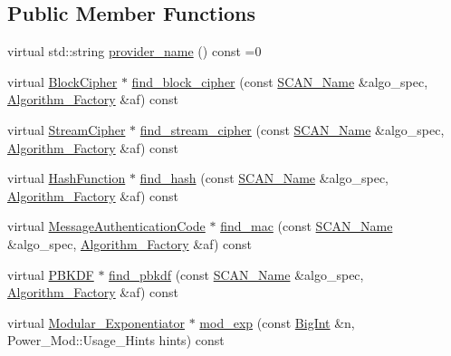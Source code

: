 \subsection*{Public Member Functions}
\begin{DoxyCompactItemize}
\item 
virtual std\-::string \hyperlink{classBotan_1_1Engine_a4c2c3ed7b3a2995e6cb8c238346b3a50}{provider\-\_\-name} () const =0
\item 
virtual \hyperlink{classBotan_1_1BlockCipher}{Block\-Cipher} $\ast$ \hyperlink{classBotan_1_1Engine_a47fd58835788badafd375554062652a2}{find\-\_\-block\-\_\-cipher} (const \hyperlink{classBotan_1_1SCAN__Name}{S\-C\-A\-N\-\_\-\-Name} \&algo\-\_\-spec, \hyperlink{classBotan_1_1Algorithm__Factory}{Algorithm\-\_\-\-Factory} \&af) const 
\item 
virtual \hyperlink{classBotan_1_1StreamCipher}{Stream\-Cipher} $\ast$ \hyperlink{classBotan_1_1Engine_a9643f23265e9505877e13487bd2e2b90}{find\-\_\-stream\-\_\-cipher} (const \hyperlink{classBotan_1_1SCAN__Name}{S\-C\-A\-N\-\_\-\-Name} \&algo\-\_\-spec, \hyperlink{classBotan_1_1Algorithm__Factory}{Algorithm\-\_\-\-Factory} \&af) const 
\item 
virtual \hyperlink{classBotan_1_1HashFunction}{Hash\-Function} $\ast$ \hyperlink{classBotan_1_1Engine_a68bc4f2f1f27610f2fec199914a2bd93}{find\-\_\-hash} (const \hyperlink{classBotan_1_1SCAN__Name}{S\-C\-A\-N\-\_\-\-Name} \&algo\-\_\-spec, \hyperlink{classBotan_1_1Algorithm__Factory}{Algorithm\-\_\-\-Factory} \&af) const 
\item 
virtual \hyperlink{classBotan_1_1MessageAuthenticationCode}{Message\-Authentication\-Code} $\ast$ \hyperlink{classBotan_1_1Engine_aa9eee4d6734e13fcb974772d9a6cddcf}{find\-\_\-mac} (const \hyperlink{classBotan_1_1SCAN__Name}{S\-C\-A\-N\-\_\-\-Name} \&algo\-\_\-spec, \hyperlink{classBotan_1_1Algorithm__Factory}{Algorithm\-\_\-\-Factory} \&af) const 
\item 
virtual \hyperlink{classBotan_1_1PBKDF}{P\-B\-K\-D\-F} $\ast$ \hyperlink{classBotan_1_1Engine_ae9a64181626039b8f49d5e2275c7ac08}{find\-\_\-pbkdf} (const \hyperlink{classBotan_1_1SCAN__Name}{S\-C\-A\-N\-\_\-\-Name} \&algo\-\_\-spec, \hyperlink{classBotan_1_1Algorithm__Factory}{Algorithm\-\_\-\-Factory} \&af) const 
\item 
virtual \hyperlink{classBotan_1_1Modular__Exponentiator}{Modular\-\_\-\-Exponentiator} $\ast$ \hyperlink{classBotan_1_1Engine_a2157445a54dc2c7f6713c1738a1b6f1f}{mod\-\_\-exp} (const \hyperlink{classBotan_1_1BigInt}{Big\-Int} \&n, Power\-\_\-\-Mod\-::\-Usage\-\_\-\-Hints hints) const 

\end{DoxyCompactItemize}
